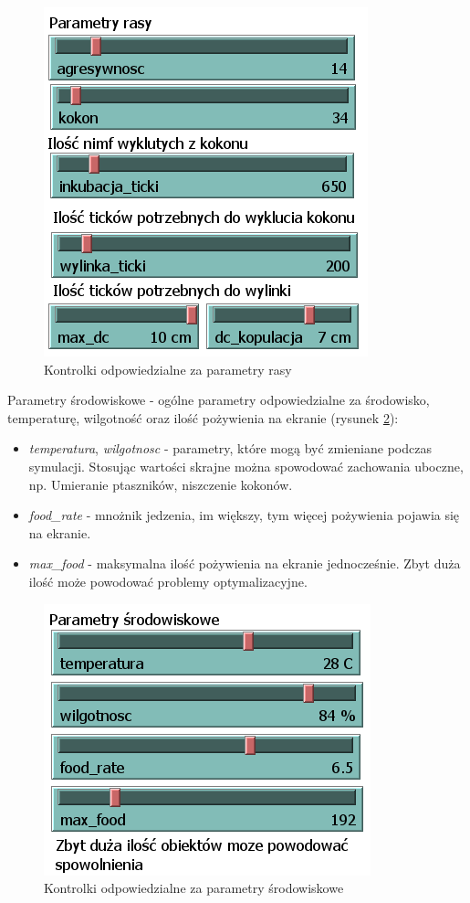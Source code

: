\documentclass[a4paper,11pt,titlepage]{article}
\begin{document}
\begin{figure}[H]
\centering
\includegraphics[width=.5\columnwidth]{img/parametry_rasy.PNG}
\caption{Kontrolki odpowiedzialne za parametry rasy}
\label{fig:5}
\end{figure}


Parametry środowiskowe - ogólne parametry odpowiedzialne za środowisko, temperaturę, wilgotność oraz ilość pożywienia na ekranie (rysunek \ref{fig:4}):
\begin{itemize}
\item \textit{temperatura}, \textit{wilgotnosc} - parametry, które mogą być zmieniane podczas symulacji. Stosując wartości skrajne można spowodować zachowania uboczne, np. Umieranie ptaszników, niszczenie kokonów.
\item \textit{food\_rate} - mnożnik jedzenia, im większy, tym więcej pożywienia pojawia się na ekranie.
\item \textit{max\_food} - maksymalna ilość pożywienia na ekranie jednocześnie. Zbyt duża ilość może powodować problemy optymalizacyjne. 
\end{itemize}

\begin{figure}[H]
\centering
\includegraphics[width=.5\columnwidth]{img/parametry_env.PNG}
\caption{Kontrolki odpowiedzialne za parametry środowiskowe}
\label{fig:4}
\end{figure}
\end{document}
